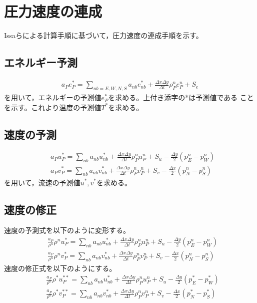 \documentclass[a4paper,10pt,fleqn,dvipdfmx]{jsarticle}
\begin{document}
\section{圧力速度の連成}
Issaらによる計算手順に基づいて，圧力速度の連成手順を示す。

\subsection{エネルギー予測}
\begin{align}
 a_Pe_P^* 
= \sum_{nb=E,W,N,S} a_{nb} e_{nb}^* + \frac{\Delta x \Delta y}{\Delta t}\rho^n_P e_P^n
 +S_e
\end{align}
を用いて，エネルギーの予測値$e^*_P$を求める。上付き添字の*は予測値である
ことを示す。これより温度の予測値$T^*$を求める。

\subsection{速度の予測}
\begin{align}
 &a_Pu_P^* 
= \sum_{nb} a_{nb} u_{nb}^* + \frac{\Delta x \Delta y}{\Delta t}\rho^n_P u_P^n
 +S_u - \frac{\Delta y}{2}(p_E^n - p_W^n)\\
 &a_Pv_P^* 
= \sum_{nb} a_{nb} v_{nb}^* + \frac{\Delta x \Delta y}{\Delta t}\rho^n_P v_P^n
 +S_v  - \frac{\Delta x}{2}(p_N^n - p_S^n)
\end{align}
を用いて，流速の予測値$u^*, v^*$を求める。

\subsection{速度の修正}
速度の予測式を以下のように変形する。
\begin{align}
 &\frac{a_P}{\rho^n} \rho^n u_P^* 
= \sum_{nb} a_{nb} u_{nb}^* + \frac{\Delta x \Delta y}{\Delta t}\rho^n_P u_P^n
 +S_u - \frac{\Delta y}{2}(p_E^n - p_W^n)\\
 &\frac{a_P}{\rho^n}\rho^n v_P^* 
= \sum_{nb} a_{nb} v_{nb}^* + \frac{\Delta x \Delta y}{\Delta t}\rho^n_P v_P^n
 +S_v  - \frac{\Delta x}{2}(p_N^n - p_S^n)
\end{align}
速度の修正式を以下のようにする。
\begin{align}
 &\frac{a_P}{\rho^n} \rho^* u_P^{**} 
= \sum_{nb} a_{nb} u_{nb}^* + \frac{\Delta x \Delta y}{\Delta t}\rho^n_P u_P^n
 +S_u - \frac{\Delta y}{2}(p_E^* - p_W^*)\\
 &\frac{a_P}{\rho^n}\rho^* v_P^{**} 
= \sum_{nb} a_{nb} v_{nb}^* + \frac{\Delta x \Delta y}{\Delta t}\rho^n_P v_P^n
 +S_v  - \frac{\Delta x}{2}(p_N^* - p_S^*)
\end{align}
\end{document}
